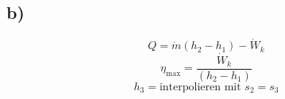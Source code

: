 

\subsection*{b)}
\[
Q = \dot{m} (h_2 - h_1) - \dot{W}_k
\]
\[
\eta_{\text{max}} = \frac{\dot{W}_k}{(h_2 - h_1)}
\]
\[
h_3 = \text{interpolieren mit } s_2 = s_3
\]